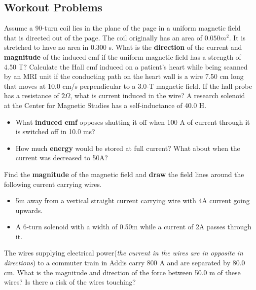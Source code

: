 \documentclass[12pt,addpoints]{exam}
\begin{document}
{{{\begin{questions}
					\subsection*{Workout Problems}
					\question Assume a 90-turn coil lies in the plane of the page in a uniform magnetic field that is directed out of the page. The coil originally has an area of  $0.050m^2$. It is stretched to have no area in 0.300 s. What is the \textbf{direction} of the current and \textbf{magnitude} of the induced emf if the uniform magnetic field has a strength of 4.50 T?\vspace{1.3in}
					\question Calculate the Hall emf induced on a patient’s heart while being scanned by an MRI unit if the conducting path on the heart wall is a wire 7.50 cm long that moves at 10.0 cm/s perpendicular to a 3.0-T magnetic field. If the hall probe has a resistance of $2\Omega$, what is current induced in the wire?\vspace{1.3in}
					\question A research solenoid at the Center for Magnetic Studies has a self-inductance of 40.0 H. 
					\begin{itemize}
						\item What \textbf{induced emf} opposes shutting it off when 100 A of current through it is switched off in 10.0 ms?\vspace{1in}
						\item How much \textbf{energy} would be stored at full current? What about when the current was decreased to 50A?\vspace{1in}
					\end{itemize}
					\question Find the \textbf{magnitude} of the magnetic field and \textbf{draw} the field lines around the following current carrying wires.
					\begin{itemize}
						\item 5m away from a vertical straight current carrying wire with 4A current going upwards.\vspace{1.5in}
						\item A 6-turn solenoid with a width of 0.50m while a current of 2A passes through it.\vspace{1in}
					\end{itemize}
					\question The wires supplying electrical power(\textit{the current in the wires are in opposite in directions}) to a commuter train in Addis carry 800 A and are separated by 80.0 cm. What is the magnitude and direction of the force between 50.0 m of these wires? Is there a risk of the wires touching?\vspace{1.5in}

\end{questions}}}}
\end{document}
